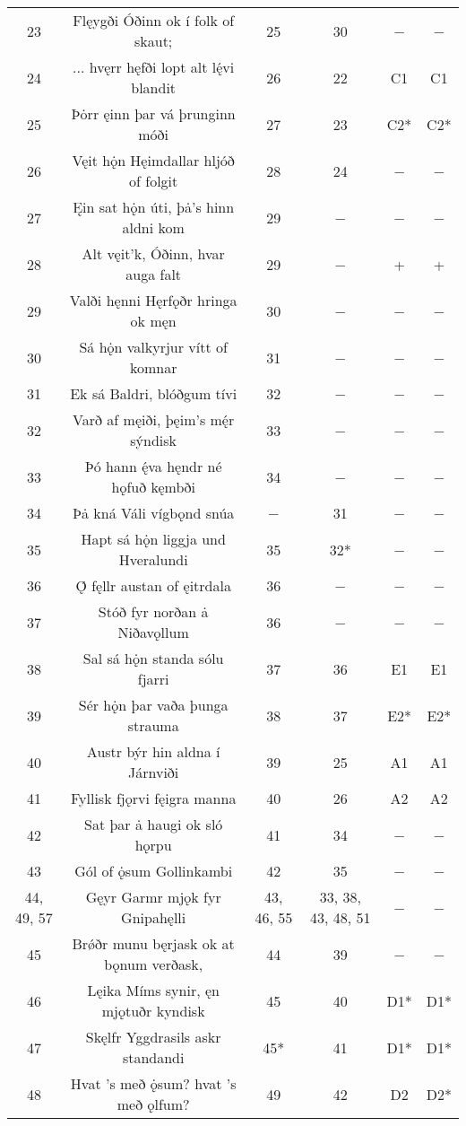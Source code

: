 \begin{longtable}{|c c c c c c|}
	23 & Flęygði Óðinn ok í folk of skaut; & 25 & 30 & − & − \\
	24 & ... hvęrr hęfði lopt alt lę́vi blandit  & 26 & 22 & C1 & C1 \\
	25 & Þȯrr ęinn þar vá þrunginn móði & 27 & 23 & C2* & C2* \\
	26 & Vęit hǫ̇n Hęimdallar hljóð of folgit & 28 & 24 & − & − \\
	27 & Ęin sat hǫ̇n úti, þȧ’s hinn aldni kom & 29 & − & − & − \\
	28 & Alt vęit’k, Óðinn, hvar auga falt & 29 & − & + & + \\
	29 & Valði hęnni Hęrfǫðr hringa ok męn & 30 & − & − & − \\
	30 & Sá hǫ̇n valkyrjur vítt of komnar & 31 & − & − & − \\
	31 & Ek sá Baldri, blóðgum tívi & 32 & − & − & − \\
	32 & Varð af męiði, þęim’s mę́r sýndisk & 33 & − & − & − \\
	33 & Þó hann ę́va hęndr né hǫfuð kęmbði & 34 & − & − & − \\
	34 & Þȧ kná Váli vígbǫnd snúa & − & 31 & − & − \\
	35 & Hapt sá hǫ̇n liggja und Hveralundi & 35 & 32* & − & − \\
	36 & Ǫ́ fęllr austan of ęitrdala & 36 & − & − & − \\
	37 & Stóð fyr norðan ȧ Niðavǫllum & 36 & − & − & − \\
	38 & Sal sá hǫ̇n standa sólu fjarri & 37 & 36 & E1 & E1 \\
	39 & Sér hǫ̇n þar vaða þunga strauma & 38 & 37 & E2* & E2* \\
	40 & Austr býr hin aldna í Járnviði & 39 & 25 & A1 & A1 \\
	41 & Fyllisk fjǫrvi fęigra manna & 40 & 26 & A2 & A2 \\
	42 & Sat þar ȧ haugi ok sló hǫrpu & 41 & 34 & − & − \\
	43 & Gól of ǫ̇sum Gollinkambi & 42 & 35 & − & − \\
	44, 49, 57 & Gęyr Garmr mjǫk fyr Gnipahęlli & 43, 46, 55 & 33, 38, 43, 48, 51 & − & − \\
	45 & Brǿðr munu bęrjask ok at bǫnum verðask, & 44 & 39 & − & − \\
	46 & Lęika Míms synir, ęn mjǫtuðr kyndisk & 45 & 40 & D1* & D1* \\
	47 & Skęlfr Yggdrasils askr standandi & 45* & 41 & D1* & D1* \\
	48 & Hvat ’s með ǫ̇sum? hvat ’s með ǫlfum? & 49 & 42 & D2 & D2* \\

\end{longtable}
